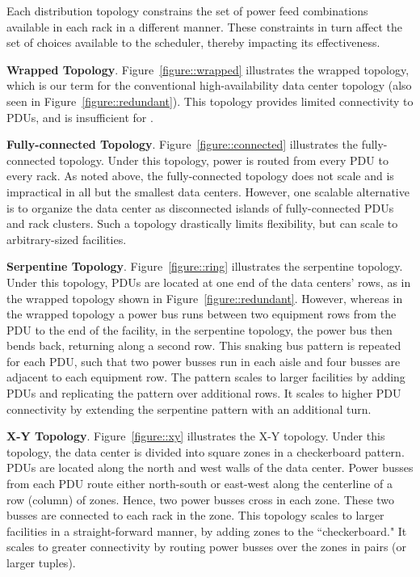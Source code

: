 Each distribution topology constrains the set of power feed combinations available in each rack in a different manner.  These constraints in turn affect the set of choices available to the \PowerRouting scheduler, thereby impacting its effectiveness.  


\textbf{Wrapped Topology}.  Figure~\ref{figure::wrapped} illustrates the wrapped topology, which is our term for the conventional  high-availability data center topology (also seen in Figure~\ref{figure::redundant}).  This topology provides limited connectivity to PDUs, and is insufficient for \PowerRouting. 

\textbf{Fully-connected Topology}.  Figure~\ref{figure::connected} illustrates the fully-connected topology.  Under this topology, power is routed from every PDU to every rack. As noted above, the fully-connected topology does not scale and is impractical in all but the smallest data centers.  However, one scalable alternative is to organize the data center as disconnected islands of fully-connected PDUs and rack clusters.  Such a topology drastically limits \PowerRouting flexibility, but can scale to arbitrary-sized facilities.

\textbf{Serpentine Topology}.  Figure~\ref{figure::ring} illustrates the serpentine topology.  Under this topology, PDUs are located at one end of the data centers' rows, as in the wrapped topology shown in Figure~\ref{figure::redundant}.  However, whereas in the wrapped topology a power bus runs between two equipment rows from the PDU to the end of the facility, in the serpentine topology, the power bus then bends back, returning along a second row.  This snaking bus pattern is repeated for each PDU, such that two power busses run in each aisle and four busses are adjacent to each equipment row.  The pattern scales to larger facilities by adding PDUs and replicating the pattern over additional rows.  It scales to higher PDU connectivity by extending the serpentine pattern with an additional turn.

\textbf{X-Y Topology}.  Figure~\ref{figure::xy} illustrates the X-Y topology. Under this topology, the data center is divided into square zones in a checkerboard pattern.  PDUs are located along the north and west walls of the data center.  Power busses from each PDU route either north-south or east-west along the centerline of a row (column) of zones.  Hence, two power busses cross in each zone.  These two busses are connected to each rack in the zone. This topology scales to larger facilities in a straight-forward manner, by adding zones to the ``checkerboard."  It scales to greater connectivity by routing power busses over the zones in pairs (or larger tuples).




